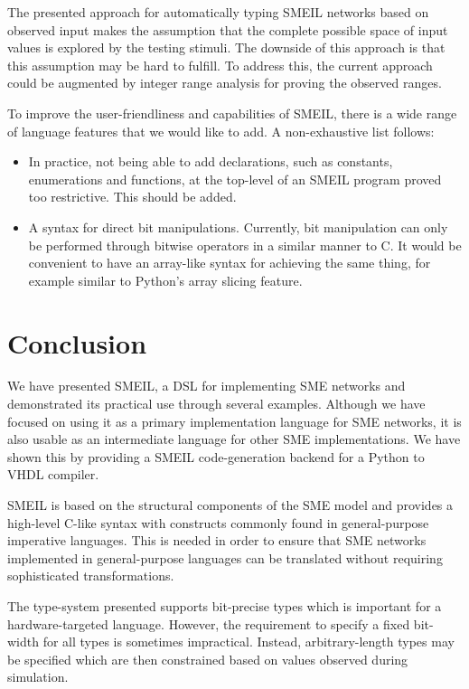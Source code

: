 The presented approach for automatically typing SMEIL networks based on observed
input makes the assumption that the complete possible space of input values is
explored by the testing stimuli. The downside of this approach is that this
assumption may be hard to fulfill. To address this, the current approach could
be augmented by integer range analysis for proving the observed ranges.

To improve the user-friendliness and capabilities of SMEIL, there is a wide
range of language features that we would like to add. A non-exhaustive list
follows:
\begin{itemize}
  \item In practice, not being able to add declarations, such as constants,
    enumerations and functions, at the top-level of an SMEIL program proved too
    restrictive. This should be added.
  \item A syntax for direct bit manipulations. Currently, bit manipulation can
    only be performed through bitwise operators in a similar manner to C. It
    would be convenient to have an array-like syntax for achieving the same
    thing, for example similar to Python's array slicing feature.
\end{itemize}

\section*{Conclusion}
We have presented SMEIL, a DSL for implementing SME networks and demonstrated
its practical use through several examples. Although we have focused on using it
as a primary implementation language for SME networks, it is also usable as an
intermediate language for other SME implementations. We have shown this by
providing a SMEIL code-generation backend for a Python to VHDL compiler.

SMEIL is based on the structural components of the SME model and provides a
high-level C-like syntax with constructs commonly found in general-purpose
imperative languages. This is needed in order to ensure that SME networks
implemented in general-purpose languages can be translated without requiring
sophisticated transformations.

The type-system presented supports bit-precise types which is important for a
hardware-targeted language. However, the requirement to specify a fixed
bit-width for all types is sometimes impractical. Instead, arbitrary-length
types may be specified which are then constrained based on values observed
during simulation.

